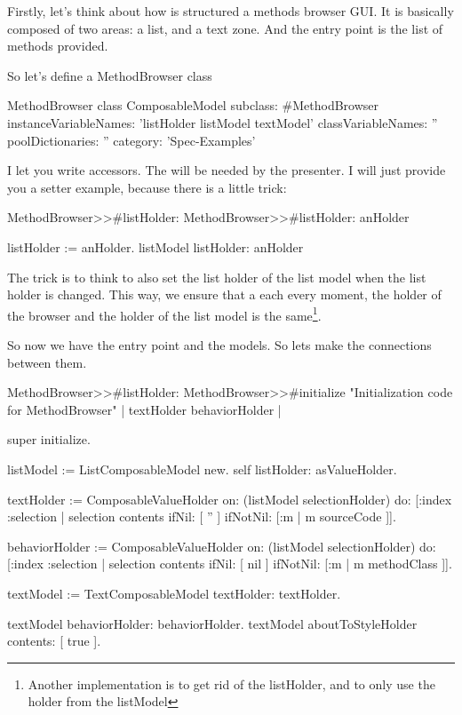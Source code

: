 \documentclass[a4paper,10pt,twoside]{book}
\begin{document}
Firstly, let's think about how is structured a methods browser GUI.
It is basically composed of two areas: a list, and a text zone. And the entry point is the list of methods provided.

So let's define a MethodBrowser class

\begin{classdef}{MethodBrowser class}
ComposableModel subclass: #MethodBrowser
	instanceVariableNames: 'listHolder listModel textModel'
	classVariableNames: ''
	poolDictionaries: ''
	category: 'Spec-Examples'
\end{classdef}

I let you write accessors. The will be needed by the presenter.
I will just provide you a setter example, because there is a little trick:

\begin{method}{MethodBrowser>>\#listHolder:}
MethodBrowser>>#listHolder: anHolder
	
	listHolder := anHolder.
	listModel listHolder: anHolder
\end{method}

The trick is to think to also set the list holder of the list model when the list holder is changed. This way, we ensure that a each every moment, the holder of the browser and the holder of the list model is the same\footnote{Another implementation is to get rid of the listHolder, and to only use the holder from the listModel}.

So now we have the entry point and the models. So lets make the connections between them.

\begin{method}{MethodBrowser>>\#listHolder:}
MethodBrowser>>#initialize
	"Initialization code for MethodBrowser"
	| textHolder behaviorHolder |
	
	super initialize.

	listModel := ListComposableModel new.
	self listHolder: {} asValueHolder.
	
	textHolder := ComposableValueHolder on: (listModel selectionHolder) do: [:index :selection | selection contents 
		ifNil: [ '' ]
		ifNotNil: [:m | m sourceCode ]].
	
	behaviorHolder := ComposableValueHolder on: (listModel selectionHolder) do: [:index :selection | selection contents 
		ifNil: [ nil ]
		ifNotNil: [:m | m methodClass ]].
	
	textModel := TextComposableModel textHolder: textHolder.

	textModel behaviorHolder: behaviorHolder.
	textModel aboutToStyleHolder contents: [ true ].
\end{method}
\end{document}
